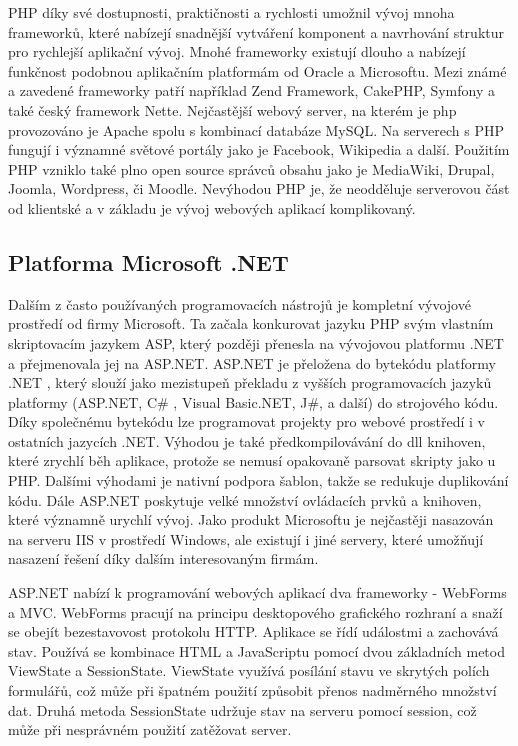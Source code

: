 \documentclass[11pt,twoside,a4paper]{book}
\begin{document}
PHP díky své dostupnosti, praktičnosti a rychlosti umožnil vývoj mnoha frameworků, které nabízejí snadnější vytváření komponent a navrhování struktur pro rychlejší aplikační vývoj. Mnohé frameworky existují dlouho a nabízejí funkčnost podobnou aplikačním platformám od Oracle a Microsoftu. Mezi známé a zavedené frameworky patří například Zend Framework, CakePHP, Symfony a také český framework Nette. Nejčastější webový server, na kterém je php provozováno je Apache spolu s kombinací databáze MySQL. Na serverech s PHP fungují i významné světové portály jako je Facebook, Wikipedia a další. Použitím PHP vzniklo také plno open source správců obsahu jako je MediaWiki, Drupal, Joomla, Wordpress, či Moodle. Nevýhodou PHP je, že neodděluje serverovou část od klientské a v základu je vývoj webových aplikací komplikovaný. \cite{wiki:frameworks}
 

\subsection{Platforma Microsoft .NET}
\label{asp.net}
Dalším z často používaných programovacích nástrojů je kompletní vývojové prostředí od firmy Microsoft. Ta začala konkurovat jazyku PHP svým vlastním skriptovacím jazykem ASP, který později přenesla na vývojovou platformu .NET a přejmenovala jej na ASP.NET. ASP.NET  je přeložena do bytekódu platformy .NET , který slouží jako mezistupeň překladu z vyšších programovacích jazyků platformy (ASP.NET, C\# , Visual Basic.NET, J\#, a další) do strojového kódu\cite{netframework}.  Díky společnému bytekódu lze programovat projekty pro webové prostředí i v ostatních jazycích .NET. Výhodou je také předkompilovávání do dll knihoven, které zrychlí běh aplikace, protože se nemusí opakovaně parsovat skripty jako u PHP. Dalšími výhodami je nativní podpora šablon, takže se redukuje duplikování kódu. Dále ASP.NET poskytuje velké množství ovládacích prvků a knihoven, které významně urychlí vývoj. Jako produkt Microsoftu je nejčastěji nasazován na serveru IIS v prostředí Windows, ale existují i jiné servery, které umožňují nasazení řešení díky dalším interesovaným firmám.\cite{aspnet}

ASP.NET nabízí k programování webových aplikací dva frameworky - WebForms a MVC. 
WebForms pracují na principu desktopového grafického rozhraní a snaží se obejít bezestavovost protokolu HTTP. Aplikace se řídí událostmi a  zachovává stav. Používá se kombinace HTML a JavaScriptu pomocí dvou základních metod ViewState a SessionState. ViewState využívá posílání stavu ve skrytých polích formulářů, což může při špatném použití způsobit přenos nadměrného množství dat. Druhá metoda SessionState udržuje stav na serveru pomocí session, což může při nesprávném použití zatěžovat server.
\end{document}
